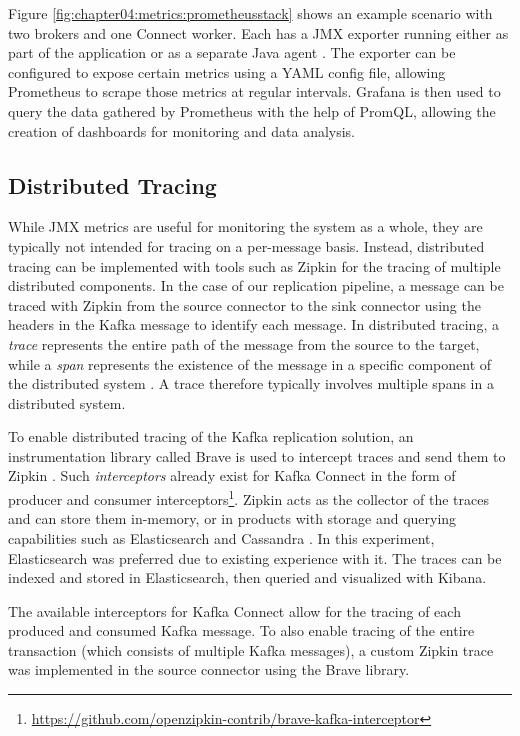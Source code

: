 Figure \ref{fig:chapter04:metrics:prometheusstack} shows an example scenario with two brokers and one Connect worker. Each has a \ac{JMX} exporter running either as part of the application or as a separate Java agent \cite{kafkamonitoringgrafana}. The exporter can be configured to expose certain metrics using a YAML config file, allowing Prometheus to scrape those metrics at regular intervals. Grafana is then used to query the data gathered by Prometheus with the help of \ac{PromQL}, allowing the creation of dashboards for monitoring and data analysis.


\subsection{Distributed Tracing}
While \ac{JMX} metrics are useful for monitoring the system as a whole, they are typically not intended for tracing on a per-message basis. Instead, distributed tracing can be implemented with tools such as Zipkin for the tracing of multiple distributed components. In the case of our replication pipeline, a message can be traced with Zipkin from the source connector to the sink connector using the headers in the Kafka message to identify each message. In distributed tracing, a \textit{trace} represents the entire path of the message from the source to the target, while a \textit{span} represents the existence of the message in a specific component of the distributed system \cite{janes2022zipkin}. A trace therefore typically involves multiple spans in a distributed system.

To enable distributed tracing of the Kafka replication solution, an instrumentation library called Brave is used to intercept traces and send them to Zipkin \cite{mallanna2020distributedzipkin}. Such \textit{interceptors} already exist for Kafka Connect in the form of producer and consumer interceptors\footnote{\url{https://github.com/openzipkin-contrib/brave-kafka-interceptor}}. 
Zipkin acts as the collector of the traces and can store them in-memory, or in products with storage and querying capabilities such as Elasticsearch and Cassandra \cite{mallanna2020distributedzipkin}. In this experiment, Elasticsearch was preferred due to existing experience with it. The traces can be indexed and stored in Elasticsearch, then queried and visualized with Kibana. %

The available interceptors for Kafka Connect allow for the tracing of each produced and consumed Kafka message. To also enable tracing of the entire transaction (which consists of multiple Kafka messages), a custom Zipkin trace was implemented in the source connector using the Brave library.






